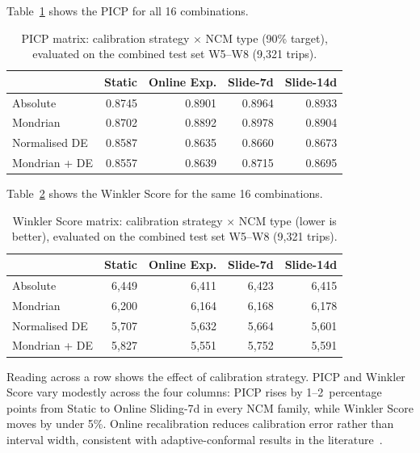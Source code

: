 \documentclass[12pt, a4paper, oneside]{report}
\begin{document}
Table~\ref{tab:exp2_picp_matrix} shows the PICP for all 16 combinations.

\begin{table}[H]
\centering
\caption{PICP matrix: calibration strategy $\times$ NCM type (90\% target), evaluated on the combined test set W5--W8 (9,321 trips).}
\label{tab:exp2_picp_matrix}
\begin{tabular}{lrrrr}
\toprule
& \textbf{Static} & \textbf{Online Exp.} & \textbf{Slide-7d} & \textbf{Slide-14d} \\
\midrule
Absolute & 0.8745 & 0.8901 & 0.8964 & 0.8933 \\
Mondrian & 0.8702 & 0.8892 & 0.8978 & 0.8904 \\
Normalised DE & 0.8587 & 0.8635 & 0.8660 & 0.8673 \\
Mondrian + DE & 0.8557 & 0.8639 & 0.8715 & 0.8695 \\
\bottomrule
\end{tabular}
\end{table}

Table~\ref{tab:exp2_winkler_matrix} shows the Winkler Score for the same 16 combinations.

\begin{table}[H]
\centering
\caption{Winkler Score matrix: calibration strategy $\times$ NCM type (lower is better), evaluated on the combined test set W5--W8 (9,321 trips).}
\label{tab:exp2_winkler_matrix}
\begin{tabular}{lrrrr}
\toprule
& \textbf{Static} & \textbf{Online Exp.} & \textbf{Slide-7d} & \textbf{Slide-14d} \\
\midrule
Absolute & 6,449 & 6,411 & 6,423 & 6,415 \\
Mondrian & 6,200 & 6,164 & 6,168 & 6,178 \\
Normalised DE & 5,707 & 5,632 & 5,664 & 5,601 \\
Mondrian + DE & 5,827 & 5,551 & 5,752 & 5,591 \\
\bottomrule
\end{tabular}
\end{table}

Reading across a row shows the effect of calibration strategy. PICP and Winkler Score vary modestly across the four columns: PICP rises by 1--2~percentage points from Static to Online Sliding-7d in every NCM family, while Winkler Score moves by under 5\%. Online recalibration reduces calibration error rather than interval width, consistent with adaptive-conformal results in the literature~\cite{Barber2023816}.
\end{document}
